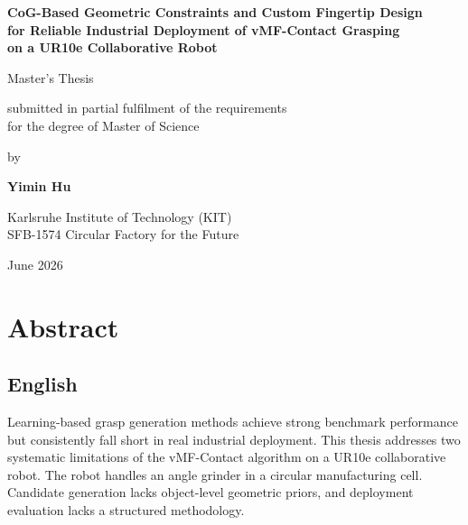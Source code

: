 \documentclass[12pt, a4paper]{report}
\begin{document}
\begin{titlepage}
  \centering
  \vspace*{2cm}

  {\LARGE\bfseries
    CoG-Based Geometric Constraints and Custom Fingertip Design\\[0.4em]
    for Reliable Industrial Deployment of vMF-Contact Grasping\\[0.4em]
    on a UR10e Collaborative Robot\par}

  \vspace{1.5cm}
  {\large Master's Thesis\par}
  \vspace{0.5cm}
  {\large submitted in partial fulfilment of the requirements\\
    for the degree of Master of Science\par}

  \vspace{2cm}
  {\large by\par}
  \vspace{0.5cm}
  {\Large\bfseries Yimin Hu\par}

  \vspace{2cm}
  {\large
    Karlsruhe Institute of Technology (KIT)\\
    SFB-1574 Circular Factory for the Future\\
    \par}

  \vfill
  {\large June 2026\par}
\end{titlepage}


\chapter*{Abstract}

\section*{English}

Learning-based grasp generation methods achieve strong benchmark performance but consistently fall short in real industrial deployment. This thesis addresses two systematic limitations of the vMF-Contact algorithm on a UR10e collaborative robot. The robot handles an angle grinder in a circular manufacturing cell. Candidate generation lacks object-level geometric priors, and deployment evaluation lacks a structured methodology.
\end{document}
